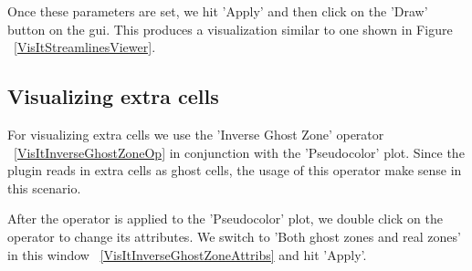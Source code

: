 Once these parameters are set, we hit 'Apply' and then click on the 'Draw' button on the gui. This produces a visualization similar to one shown in Figure ~\ref{VisItStreamlinesViewer}.



\begin{figure}[h]
  \centering
 \vspace{5pt}
  \hspace{10pt}
 \hspace{10pt}
  \caption{}
 \vspace{-10pt}
  \label{}
\end{figure}


\subsection{Visualizing extra cells}

For visualizing extra cells we use the 'Inverse Ghost Zone' operator
~\ref{VisItInverseGhostZoneOp} in conjunction with the 'Pseudocolor'
plot. Since the plugin reads in extra cells as ghost cells, the usage
of this operator make sense in this scenario.


After the operator is applied to the 'Pseudocolor' plot, we double
click on the operator to change its attributes. We switch to 'Both
ghost zones and real zones' in this window
~\ref{VisItInverseGhostZoneAttribs} and hit 'Apply'.

